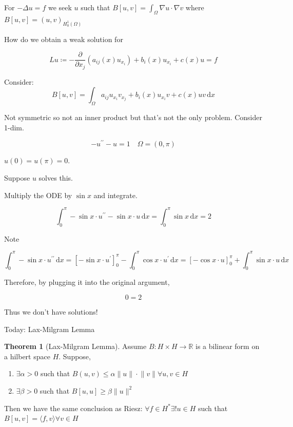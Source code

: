 \documentclass{article}
\theoremstyle{definition}
\newtheorem{theorem}{Theorem}
\begin{document}
For \(- \Delta u = f\) we seek \(u\) such that \(B[u,v] = \int_\Omega \nabla u \cdot \nabla v\) where \(B[u,v] = (u,v)_{H^1_0(\Omega)}\) 

How do we obtain a weak solution for

\[
    Lu \coloneqq - \frac{\partial}{\partial x_j} \left( a_{ij}(x) u_{x_i} \right) + b_i(x) u_{x_i} + c(x)u = f
\]

Consider:
\[
    B[u,v] = \int_{\Omega}^{} a_{ij} u_{x_i}v_{x_j} + b_i(x) u_{x_i}v + c(x) uv \,\mathrm{d}x 
\]

Not symmetric so not an inner product but that's not the only problem. Consider 1-dim.

\[
    - u^{\prime\prime} - u = 1 \quad \Omega = (0,\pi)
\]

\(u(0)=u(\pi)=0\).

Suppose \(u\) solves this.

Multiply the ODE by \(\sin x\) and integrate.

\[
    \int_{0}^{\pi} - \sin x \cdot u^{\prime\prime} - \sin x \cdot u \,\mathrm{d}x = \int_{0}^{\pi } \sin x \,\mathrm{d}x = 2
\]

Note

\[
    \int_{0}^{\pi} - \sin x \cdot u^{\prime\prime} \,\mathrm{d}x = \left[ - \sin x\cdot u^{\prime} \right]^\pi_0 - \int_{0}^{\pi} \cos x \cdot u^{\prime} \,\mathrm{d}x = \left[ - \cos x \cdot u \right]^\pi_0 + \int_{0}^{\pi} \sin x \cdot u \,\mathrm{d}x 
\]

Therefore, by plugging it into the original argument,

\[
    0 = 2
\]

Thus we don't have solutions!

Today: Lax-Milgram Lemma

\begin{theorem}
    [Lax-Milgram Lemma] Assume \(B: H \times H \to \mathbb{R}\) is a bilinear form on a hilbert space \(H\). Suppose,

    \begin{enumerate}[label=\roman*)]
        \item \(\exists \alpha > 0\) such that \(B(u,v) \leq \alpha \lVert u \rVert \cdot \lVert v \rVert \forall u,v\in H\) 
        \item \(\exists \beta > 0\) such that \(B[u,u] \geq \beta \lVert u \rVert ^2\)  
    \end{enumerate} 

    Then we have the same conclusion as Riesz: \(\forall f\in H^{\ast} \exists ! u\in H\) such that \(B[u,v] = \langle f,v \rangle \forall v\in H\) 
\end{theorem}
\end{document}
